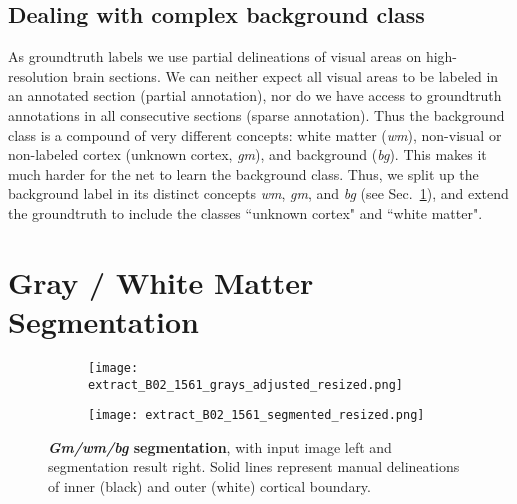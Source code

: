 \documentclass{article}
\begin{document}
\vspace*{-.5\baselineskip}
\subsection{Dealing with complex background class}
\label{sec:arch:labels}
\vspace*{-.5\baselineskip}

As groundtruth labels we use partial delineations of visual areas on high-resolution brain sections. 
We can neither expect all visual areas to be labeled in an annotated section (partial annotation), nor do we have access to groundtruth annotations in all consecutive sections (sparse annotation).
Thus the background class is a compound of very different concepts: white matter (\emph{wm}), non-visual or non-labeled cortex (unknown cortex, \emph{gm}), and background (\emph{bg}). 
This makes it much harder for the net to learn the background class. 
Thus, we split up the background label in its distinct concepts \emph{wm}, \emph{gm}, and \emph{bg} (see Sec.~\ref{sec:seg}), and extend the groundtruth to include the classes ``unknown cortex" and ``white matter".

\section{Gray / White Matter Segmentation}
\label{sec:seg}

\begin{figure} %
		\centering
		\begin{subfigure}[t]{.38\linewidth}
			\centering
			\texttt{[image: extract\_B02\_1561\_grays\_adjusted\_resized.png]}
		\end{subfigure}%
		\begin{subfigure}[t]{.38\linewidth}
			\centering
			\texttt{[image: extract\_B02\_1561\_segmented\_resized.png]}
		\end{subfigure}
		\caption{
			\textbf{\emph{Gm/wm/bg} segmentation}, with input image left and segmentation result right.
			Solid lines represent manual delineations of inner (black) and outer (white) cortical boundary.
		}
		\label{fig:bgseg}
\end{figure}
\end{document}
